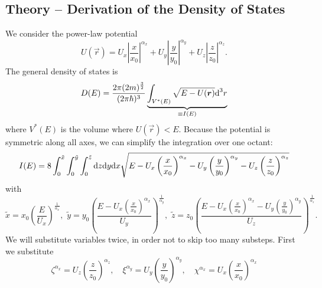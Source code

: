 \subsection{Theory -- Derivation of the Density of States}
\label{sec:appendix_dos}
We consider the power-law potential
\[
    U(\vec{r}) = U_x \left| \frac{x}{x_0} \right|^{\alpha_x} + U_y \left| \frac{y}{y_0} \right|^{\alpha_y} + U_z \left| \frac{z}{z_0} \right|^{\alpha_z}.
\]
The general density of states is \cite{PhysRevA.35.4354}
\begin{equation*}
    D(E) = \frac{2\pi(2m)^\frac{3}{2}}{(2\pi\hbar)^3} \underbrace{\int_{V^*(E)} \sqrt{E - U(\boldsymbol{r})}\text{d}^{3}r}_{\equiv I(E)}
\end{equation*}
where $V^*(E)$ is the volume where $U(\vec{r}) < E$. Because the potential is symmetric along all axes, we can simplify the integration over one octant:
\begin{equation*}
    I(E) = 8\int_0^{\tilde{x}} \int_0^{\tilde{y}} \int_0^{\tilde{z}} \text{d}z \text{d}y \text{d}x \sqrt{E - U_x \left(\frac{x}{x_0}\right)^{\alpha_x} - U_y \left(\frac{y}{y_0}\right)^{\alpha_y} - U_z \left(\frac{z}{z_0}\right)^{\alpha_z}}
\end{equation*}
with
\begin{equation*}
    \tilde{x} = x_0 \left(\frac{E}{U_x}\right)^{\frac{1}{\alpha_x}},
    \,\, 
    \tilde{y} = y_0 \left(\frac{E - U_x\left(\frac{x}{x_0}\right)^{\alpha_x}}{U_y}\right)^{\frac{1}{\alpha_y}},
    \,\,
    \tilde{z} = z_0 \left(\frac{E - U_x\left(\frac{x}{x_0}\right)^{\alpha_x} - U_y\left(\frac{y}{y_0}\right)^{\alpha_y} }{U_z}\right)^{\frac{1}{\alpha_z}}. 
\end{equation*}
We will substitute variables twice, in order not to skip too many substeps. First we substitute
\begin{equation*}
    \zeta^{\alpha_x} = U_z \left(\frac{z}{z_0}\right)^{\alpha_z}, \quad \xi^{\alpha_y} = U_y \left(\frac{y}{y_0}\right)^{\alpha_y}, \quad
    \chi^{\alpha_x} = U_x \left(\frac{x}{x_0}\right)^{\alpha_x}
\end{equation*}
